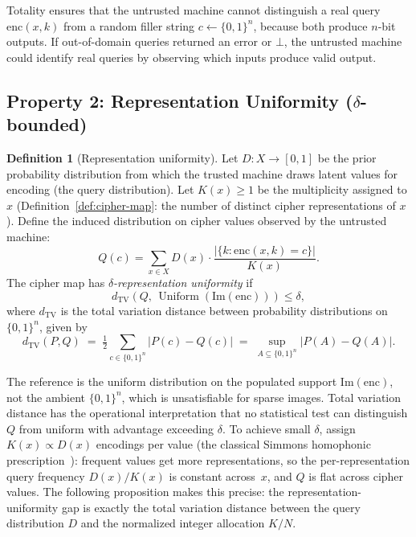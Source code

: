 \documentclass[11pt]{article}
\theoremstyle{definition}
\newtheorem{definition}{Definition}[section]
\theoremstyle{plain}
\theoremstyle{remark}
\newcommand{\enc}{\mathrm{enc}}
\newcommand{\im}{\mathrm{Im}}
\newcommand{\TV}{d_{\mathrm{TV}}}
\DeclareMathOperator{\Uniform}{Uniform}
\begin{document}
Totality ensures that the untrusted machine cannot distinguish a real query
$\enc(x, k)$ from a random filler string $c \gets \{0,1\}^n$, because both
produce $n$-bit outputs.  If out-of-domain queries returned an error or
$\bot$, the untrusted machine could identify real queries by observing which
inputs produce valid output.

\subsection{Property 2: Representation Uniformity (\texorpdfstring{$\delta$}{delta}-bounded)}

\begin{definition}[Representation uniformity]
\label{def:rep-uniformity}
Let $D : X \to [0, 1]$ be the prior probability distribution from which
the trusted machine draws latent values for encoding (the query
distribution).  Let $K(x) \geq 1$ be the multiplicity assigned to $x$
(Definition~\ref{def:cipher-map}: the number of distinct cipher
representations of $x$).  Define the induced distribution on cipher
values observed by the untrusted machine:
\begin{equation}
Q(c) = \sum_{x \in X} D(x) \cdot \frac{|\{k : \enc(x,k) = c\}|}{K(x)}.
\end{equation}
The cipher map has \emph{$\delta$-representation uniformity} if
\begin{equation}
\TV(Q,\, \Uniform(\im(\enc))) \leq \delta,
\end{equation}
where $\TV$ is the total variation distance between probability
distributions on $\{0,1\}^n$, given by
\begin{equation}
\TV(P, Q) \;=\; \tfrac{1}{2} \!\!\!\! \sum_{c \in \{0,1\}^n} \!\!\!\! |P(c) - Q(c)|
  \;=\; \!\! \sup_{A \subseteq \{0,1\}^n} \!\!\!\! |P(A) - Q(A)|.
\end{equation}
\end{definition}

The reference is the uniform distribution on the populated support
$\im(\enc)$, not the ambient $\{0,1\}^n$, which is unsatisfiable for sparse
images.  Total variation distance has the operational interpretation that no
statistical test can distinguish $Q$ from uniform with advantage
exceeding $\delta$.  To achieve small $\delta$, assign
$K(x) \propto D(x)$ encodings per value (the classical Simmons
homophonic prescription~\cite{simmons1979symmetric}): frequent values
get more representations, so the per-representation query frequency
$D(x) / K(x)$ is constant across~$x$, and $Q$ is flat across
cipher values.  The following proposition makes this precise: the
representation-uniformity gap is exactly the total variation distance
between the query distribution $D$ and the normalized integer
allocation $K/N$.
\end{document}
